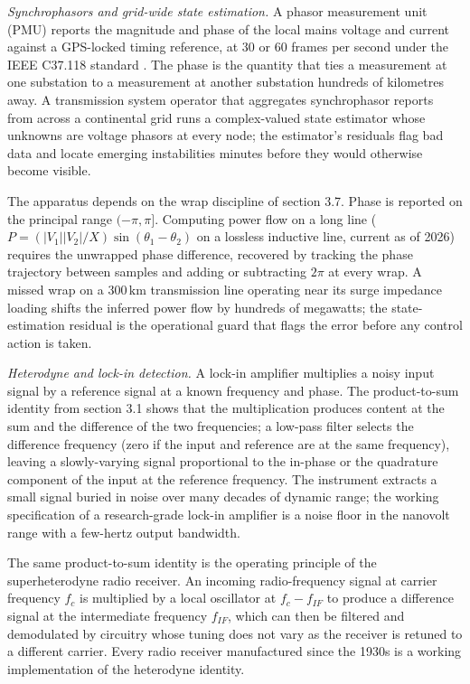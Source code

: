 \textit{Synchrophasors and grid-wide state estimation.}
A phasor measurement unit (PMU) reports the magnitude and phase of
the local mains voltage and current against a GPS-locked timing
reference, at $30$ or $60$ frames per second under the IEEE
C37.118 standard \cite{paper:v2ch03-itrich-c37-118}. The phase is
the quantity that ties a measurement at one substation to a
measurement at another substation hundreds of kilometres away. A
transmission system operator that aggregates synchrophasor reports
from across a continental grid runs a complex-valued state
estimator whose unknowns are voltage phasors at every node; the
estimator's residuals flag bad data and locate emerging
instabilities minutes before they would otherwise become visible.

The apparatus depends on the wrap discipline of section 3.7. Phase
is reported on the principal range $(-\pi, \pi]$. Computing power
flow on a long line ($P = (|V_{1}||V_{2}|/X)\sin(\theta_{1} -
\theta_{2})$ on a lossless inductive line, current as of 2026)
requires the unwrapped phase difference, recovered by tracking the
phase trajectory between samples and adding or subtracting $2\pi$
at every wrap. A missed wrap on a $300\,\si{\kilo\meter}$
transmission line operating near its surge impedance loading shifts
the inferred power flow by hundreds of megawatts; the
state-estimation residual is the operational guard that flags the
error before any control action is taken.

\textit{Heterodyne and lock-in detection.} A lock-in amplifier
multiplies a noisy input signal by a reference signal at a known
frequency and phase. The product-to-sum identity from section 3.1
shows that the multiplication produces content at the sum and the
difference of the two frequencies; a low-pass filter selects the
difference frequency (zero if the input and reference are at the
same frequency), leaving a slowly-varying signal proportional to
the in-phase or the quadrature component of the input at the
reference frequency. The instrument extracts a small signal buried
in noise over many decades of dynamic range; the working
specification of a research-grade lock-in amplifier is a noise
floor in the nanovolt range with a few-hertz output bandwidth.

The same product-to-sum identity is the operating principle of the
superheterodyne radio receiver. An incoming radio-frequency
signal at carrier frequency $f_{c}$ is multiplied by a local
oscillator at $f_{c} - f_{IF}$ to produce a difference signal at
the intermediate frequency $f_{IF}$, which can then be filtered and
demodulated by circuitry whose tuning does not vary as the
receiver is retuned to a different carrier. Every radio receiver
manufactured since the 1930s is a working implementation of the
heterodyne identity.


